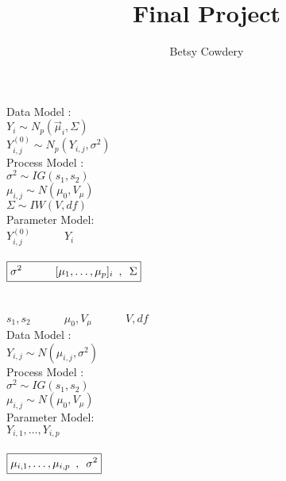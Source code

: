 \documentclass[11pt,fleqn]{article}
\theoremstyle{definition}
\theoremstyle{remark}
\theoremstyle{definition}
\begin{document}
\author{Betsy Cowdery}
\title{Final Project}
\date{}

\maketitle


\noindent Data Model :\\
$Y_i \sim N_p(\vec{\mu}_i, \Sigma) $\\
$Y^{(0)}_{i,j} \sim N_p(Y_{i,j}, \sigma^2)$\\
 

\noindent Process Model :\\
$\sigma^2 \sim IG(s_1,s_2)$\\
$\mu_{i,j} \sim N(\mu_0, V_\mu)$\\
$\Sigma \sim IW(V, df)$ \\

\noindent Parameter Model: \\

$\boxed{Y^{(0)}_{i,j} \hspace{3em} Y_i }$\\
\\

$\boxed{\sigma^2 \hspace{3em} [\mu_1, \dots, \mu_p]_i \hspace{.5em},\hspace{.5em}  \Sigma}$\\
\\
\\

$\boxed{s_1,s_2 \hspace{3em} \mu_0, V_{\mu} \hspace{3em} V, df}$\\



\noindent Data Model :\\
$Y_{i,j} \sim N(\mu_{i,j}, \sigma^2) $\\
 

\noindent Process Model :\\
$\sigma^2 \sim IG(s_1,s_2)$\\
$\mu_{i,j} \sim N(\mu_0, V_\mu)$\\


\noindent Parameter Model: \\

$\boxed{Y_{i,1}, \dots, Y_{i,p}}$\\
\\

$\boxed{\mu_{i,1}, \dots, \mu_{i,p} \hspace{.5em},\hspace{.5em}  \sigma^2}$\\
\\
\\
\end{document}
